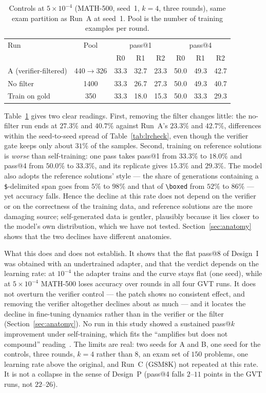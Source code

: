 \documentclass[runningheads]{llncs}
\begin{document}
\begin{table}[t]
\caption{Controls at $5\times10^{-4}$ (MATH-500, seed~1, $k=4$, three rounds),
same exam partition as Run~A at seed~1. Pool is the number of training
examples per round.}
\label{tab:controls}
\centering
\setlength{\tabcolsep}{5pt}
\begin{tabular}{lccccccc}
\toprule
Run & Pool & \multicolumn{3}{c}{pass@1} & \multicolumn{3}{c}{pass@4} \\
 &  & R0 & R1 & R2 & R0 & R1 & R2 \\
\midrule
A (verifier-filtered) & 440$\to$326 & 33.3 & 32.7 & 23.3 & 50.0 & 49.3 & 42.7 \\
No filter             & 1400 & 33.3 & 26.7 & 27.3 & 50.0 & 49.3 & 40.7 \\
Train on gold         & 350  & 33.3 & 18.0 & 15.3 & 50.0 & 33.3 & 29.3 \\
\bottomrule
\end{tabular}
\end{table}

Table~\ref{tab:controls} gives two clear readings. First, removing the filter
changes little: the no-filter run ends at $27.3\%$ and $40.7\%$ against Run~A's
$23.3\%$ and $42.7\%$, differences within the seed-to-seed spread of
Table~\ref{tab:lrcheck}, even though the verifier gate keeps only about $31\%$
of the samples. Second, training on reference solutions is \emph{worse} than
self-training: one pass takes pass@1 from $33.3\%$ to $18.0\%$ and pass@4 from
$50.0\%$ to $33.3\%$, and its replicate gives $15.3\%$ and $29.3\%$. The model
also adopts the reference solutions' style --- the share of generations
containing a \texttt{\$}-delimited span goes from $5\%$ to $98\%$ and that of
\texttt{\textbackslash boxed} from $52\%$ to $86\%$ --- yet accuracy falls.
Hence the decline at this rate does not depend on the verifier or on the
correctness of the training data, and reference solutions are the more
damaging source; self-generated data is gentler, plausibly because it lies
closer to the model's own distribution, which we have not tested.
Section~\ref{sec:anatomy} shows that the two declines have different
anatomies.

What this does and does not establish. It shows that the flat pass@8 of
Design~I was obtained with an undertrained adapter, and that the verdict
depends on the learning rate: at $10^{-4}$ the adapter trains and the curve
stays flat (one seed), while at $5\times10^{-4}$ MATH-500 loses accuracy over
rounds in all four GVT runs. It does not
overturn the verifier control --- the patch shows no consistent effect, and
removing the verifier altogether declines about as much --- and it locates the
decline in fine-tuning dynamics rather than in the verifier or the filter
(Section~\ref{sec:anatomy}). No run in this study
showed a sustained pass@$k$ improvement under self-training, which fits the ``amplifies but does not
compound'' reading~\cite{ref_teacherfree}. The limits are real: two seeds for A
and B, one seed for the controls, three rounds, $k=4$ rather than $8$, an exam
set of $150$ problems, one learning rate above the original, and Run~C
(GSM8K) not repeated at this rate. It is not a collapse in the sense of
Design~P (pass@4 falls $2$--$11$ points in the GVT runs, not $22$--$26$).
\end{document}
